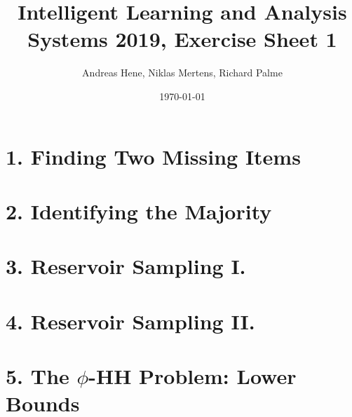 \documentclass{article}
\begin{document}
\title{Intelligent Learning and Analysis Systems 2019, Exercise Sheet 1}
\author{Andreas Hene, Niklas Mertens, Richard Palme}
\date{\today}
\maketitle

\section*{1. Finding Two Missing Items}


\section*{2. Identifying the Majority}


\section*{3. Reservoir Sampling I.}


\section*{4. Reservoir Sampling II.}


\section*{5. The $\phi$-HH Problem: Lower Bounds}
\end{document}
